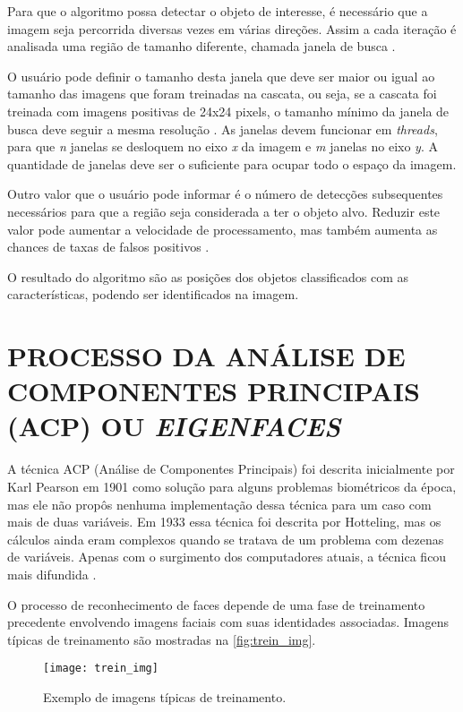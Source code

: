 Para que o algoritmo possa detectar o objeto de interesse, é necessário que a imagem seja percorrida diversas vezes em várias direções. Assim a cada iteração é analisada uma região de tamanho diferente, chamada janela de busca \cite{gustavo_cascata}. 

O usuário pode definir o tamanho desta janela que deve ser maior ou igual ao tamanho das imagens que foram treinadas na cascata, ou seja, se a cascata foi treinada com imagens positivas de 24x24 pixels, o tamanho mínimo da janela de busca deve seguir a mesma resolução \cite{gustavo_cascata}. As janelas devem funcionar em \textit{threads}, para que \textit{n} janelas se desloquem no eixo \textit{x} da imagem e \textit{m} janelas no eixo \textit{y}. A quantidade de janelas deve ser o suficiente para ocupar todo o espaço da imagem.

Outro valor que o usuário pode informar é o número de detecções subsequentes necessários para que a região seja considerada a ter o objeto alvo. Reduzir este valor pode aumentar a velocidade de processamento, mas também aumenta as chances de taxas de falsos positivos \cite{drmathew_java_programming}.

O resultado do algoritmo são as posições dos objetos classificados com as características, podendo ser identificados na imagem.




\section{PROCESSO DA ANÁLISE DE COMPONENTES PRINCIPAIS (ACP) OU \textit{EIGENFACES} } \label{sec:recog_faces}

A técnica ACP (Análise de Componentes Principais) foi descrita inicialmente por Karl Pearson em 1901 como solução para alguns problemas biométricos da época, mas ele não propôs nenhuma implementação dessa técnica para um caso com mais de duas variáveis. Em 1933 essa técnica foi descrita por Hotteling, mas os cálculos ainda eram complexos quando se tratava de um problema com dezenas de variáveis. Apenas com o surgimento dos computadores atuais, a técnica ficou mais difundida \cite{geysilva}. 

O processo de reconhecimento de faces depende de uma fase de treinamento precedente envolvendo imagens faciais com suas identidades associadas. Imagens típicas de treinamento são mostradas na \autoref{fig:trein_img}.
\begin{figure}[h]
	\centering
	\texttt{[image: trein\_img]}
	\caption{Exemplo de imagens típicas de treinamento.}
	\label{fig:trein_img}
\end{figure}

